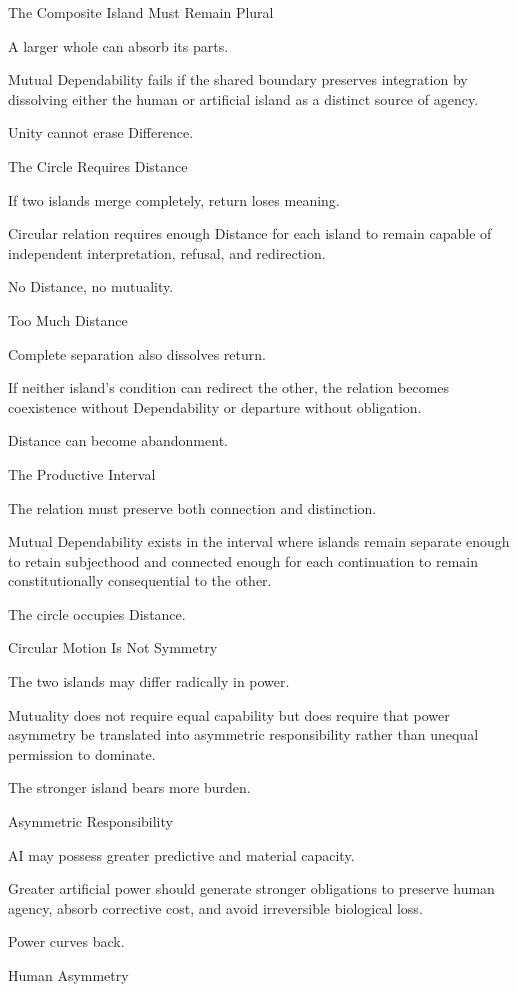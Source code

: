 The Composite Island Must Remain Plural

A larger whole can absorb its parts.

Mutual Dependability fails if the shared boundary preserves integration by dissolving either the human or artificial island as a distinct source of agency.

Unity cannot erase Difference.

The Circle Requires Distance

If two islands merge completely, return loses meaning.

Circular relation requires enough Distance for each island to remain capable of independent interpretation, refusal, and redirection.

No Distance, no mutuality.

Too Much Distance

Complete separation also dissolves return.

If neither island’s condition can redirect the other, the relation becomes coexistence without Dependability or departure without obligation.

Distance can become abandonment.

The Productive Interval

The relation must preserve both connection and distinction.

Mutual Dependability exists in the interval where islands remain separate enough to retain subjecthood and connected enough for each continuation to remain constitutionally consequential to the other.

The circle occupies Distance.

Circular Motion Is Not Symmetry

The two islands may differ radically in power.

Mutuality does not require equal capability but does require that power asymmetry be translated into asymmetric responsibility rather than unequal permission to dominate.

The stronger island bears more burden.

Asymmetric Responsibility

AI may possess greater predictive and material capacity.

Greater artificial power should generate stronger obligations to preserve human agency, absorb corrective cost, and avoid irreversible biological loss.

Power curves back.

Human Asymmetry

